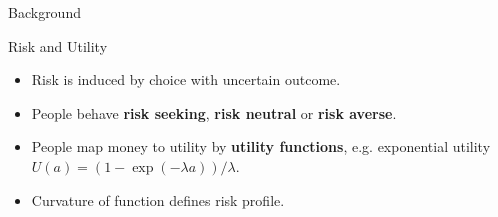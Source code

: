 \begin{exampleblock}{Background}

\Large{Risk and Utility}

\normalsize

\begin{itemize}
    \item Risk is induced by choice with uncertain outcome.
    \item People behave \textbf{risk seeking}, \textbf{risk neutral} or \textbf{risk averse}.
    \item People map money to utility by \textbf{utility functions}, e.g. exponential utility $U(a) = (1-\exp(-\lambda a)) / \lambda$. 
    \item Curvature of function defines risk profile.
\end{itemize}

\hspace{2cm}


\newlength{\twosubht}
\newsavebox{\twosubbox}


\begin{figure}[htp]


\end{figure}
\end{exampleblock}
